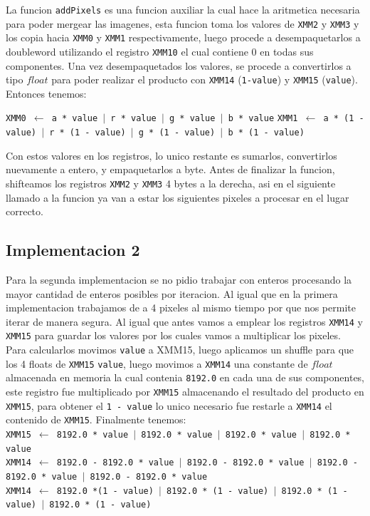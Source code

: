 La funcion \texttt{addPixels} es una funcion auxiliar la cual hace la aritmetica necesaria para poder mergear las imagenes, esta funcion toma los valores de \texttt{XMM2} y \texttt{XMM3} y los copia hacia \texttt{XMM0} y \texttt{XMM1} respectivamente, luego procede a desempaquetarlos a doubleword utilizando el registro \texttt{XMM10} el cual contiene 0 en todas sus componentes. Una vez desempaquetados los valores, se procede a convertirlos a tipo $float$ para poder realizar el producto con \texttt{XMM14} (\texttt{1-value}) y \texttt{XMM15} (\texttt{value}). Entonces tenemos:

\noindent
\texttt{XMM0 $\gets$ a * value $\vert$ r * value $\vert$ g * value $\vert$ b * value}
\texttt{XMM1 $\gets$ a * (1 - value) $\vert$ r * (1 - value) $\vert$ g * (1 - value) $\vert$ b * (1 - value)}

Con estos valores en los registros, lo unico restante es sumarlos, convertirlos nuevamente a entero, y empaquetarlos a byte. Antes de finalizar la funcion, shifteamos los registros \texttt{XMM2} y \texttt{XMM3} 4 bytes a la derecha, asi en el siguiente llamado a la funcion ya van a estar los siguientes pixeles a procesar en el lugar correcto.

\subsection{Implementacion 2}
Para la segunda implementacion se no pidio trabajar con enteros procesando la mayor cantidad de enteros posibles por iteracion. Al igual que en la primera implementacion trabajamos de a 4 pixeles al mismo tiempo por que nos permite iterar de manera segura. Al igual que antes vamos a emplear los registros \texttt{XMM14} y \texttt{XMM15} para guardar los valores por los cuales vamos a multiplicar los pixeles. Para calcularlos movimos \texttt{value} a XMM15, luego aplicamos un shuffle para que los 4 floats de \texttt{XMM15} \texttt{value}, luego movimos a \texttt{XMM14} una constante de $float$ almacenada en memoria la cual contenia \texttt{8192.0} en cada una de sus componentes, este registro fue multiplicado por \texttt{XMM15} almacenando el resultado del producto en \texttt{XMM15}, para obtener el \texttt{1 - value} lo unico necesario fue restarle a \texttt{XMM14} el contenido de \texttt{XMM15}. Finalmente tenemos:\\

\noindent
\texttt{XMM15 $\gets$ 8192.0 * value $\vert$ 8192.0 * value $\vert$ 8192.0 * value $\vert$ 8192.0 * value}\\
\texttt{XMM14 $\gets$ 8192.0 - 8192.0 * value $\vert$ 8192.0 - 8192.0 * value $\vert$ 8192.0 - 8192.0 * value $\vert$ 8192.0 - 8192.0 * value}\\
\texttt{XMM14 $\gets$ 8192.0 *(1 - value) $\vert$ 8192.0 * (1 - value) $\vert$ 8192.0 * (1 - value) $\vert$ 8192.0 * (1 - value)}\\

